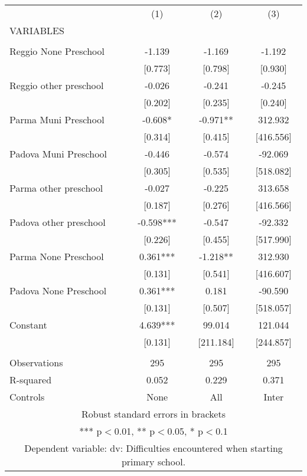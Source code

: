 \begin{tabular}{lccc} \hline
 & (1) & (2) & (3) \\
VARIABLES &  &  &  \\ \hline
 &  &  &  \\
Reggio None Preschool & -1.139 & -1.169 & -1.192 \\
 & [0.773] & [0.798] & [0.930] \\
Reggio other preschool & -0.026 & -0.241 & -0.245 \\
 & [0.202] & [0.235] & [0.240] \\
Parma Muni Preschool & -0.608* & -0.971** & 312.932 \\
 & [0.314] & [0.415] & [416.556] \\
Padova Muni Preschool & -0.446 & -0.574 & -92.069 \\
 & [0.305] & [0.535] & [518.082] \\
Parma other preschool & -0.027 & -0.225 & 313.658 \\
 & [0.187] & [0.276] & [416.566] \\
Padova other preschool & -0.598*** & -0.547 & -92.332 \\
 & [0.226] & [0.455] & [517.990] \\
Parma None Preschool & 0.361*** & -1.218** & 312.930 \\
 & [0.131] & [0.541] & [416.607] \\
Padova None Preschool & 0.361*** & 0.181 & -90.590 \\
 & [0.131] & [0.507] & [518.057] \\
Constant & 4.639*** & 99.014 & 121.044 \\
 & [0.131] & [211.184] & [244.857] \\
 &  &  &  \\
Observations & 295 & 295 & 295 \\
R-squared & 0.052 & 0.229 & 0.371 \\
 Controls & None & All & Inter \\ \hline
\multicolumn{4}{c}{ Robust standard errors in brackets} \\
\multicolumn{4}{c}{ *** p$<$0.01, ** p$<$0.05, * p$<$0.1} \\
\multicolumn{4}{c}{ Dependent variable: dv: Difficulties encountered when starting primary school.} \\
\end{tabular}
